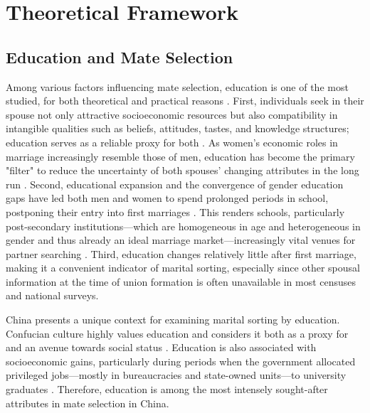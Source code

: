 \section{Theoretical Framework}
\label{sec:ch4-theoretical-framework}

\subsection{Education and Mate Selection}

Among various factors influencing mate selection, education is one of the most studied, for both theoretical and practical reasons \parencite{blossfeldEducationalAssortativeMarriage2009,kalmijnIntermarriageHomogamyCauses1998}. First, individuals seek in their spouse not only attractive socioeconomic resources but also compatibility in intangible qualities such as beliefs, attitudes, tastes, and knowledge structures; education serves as a reliable proxy for both \parencite{kalmijnIntermarriageHomogamyCauses1998}. As women's economic roles in marriage increasingly resemble those of men, education has become the primary "filter" to reduce the uncertainty of both spouses' changing attributes in the long run \parencite{oppenheimerTheoryMarriageTiming1988,vanbavelReversalGenderGap2018}. Second, educational expansion and the convergence of gender education gaps have led both men and women to spend prolonged periods in school, postponing their entry into first marriages \parencite{jiangMarriageSqueezeNeverMarried2014}. This renders schools, particularly post-secondary institutions—which are homogeneous in age and heterogeneous in gender and thus already an ideal marriage market—increasingly vital venues for partner searching \parencite{blossfeldWhoMarriesWhom2003,jiangMarriageSqueezeNeverMarried2014}. Third, education changes relatively little after first marriage, making it a convenient indicator of marital sorting, especially since other spousal information at the time of union formation is often unavailable in most censuses and national surveys.

China presents a unique context for examining marital sorting by education. Confucian culture highly values education and considers it both as a proxy for and an avenue towards social status \parencite{chenEducationFeverChina2021,guSacrificeIndebtednessIntergenerational2022}. Education is also associated with socioeconomic gains, particularly during periods when the government allocated privileged jobs—mostly in bureaucracies and state-owned units—to university graduates \parencite{bianChineseSocialStratification2002}. Therefore, education is among the most intensely sought-after attributes in mate selection in China.

